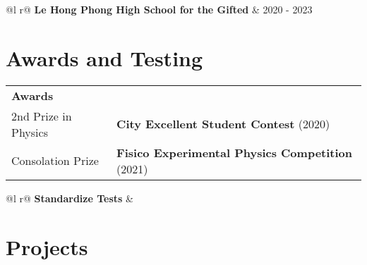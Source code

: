 \documentclass[a4paper,12pt]{article}
\begin{document}
\begin{tabularx}{\linewidth}{ @{}l r@{} }
\textbf{Le Hong Phong High School for the Gifted} & \hfill 2020 - 2023 \\[3.75pt]
\end{tabularx}

\section{Awards and Testing}
\begin{tabularx}{\linewidth}{@{}l X@{}}	
\textbf{Awards} & \hfill \\[3.75pt]
 2nd Prize in Physics & \textbf{City Excellent Student Contest} \hfill \normalsize (2020) \\
Consolation Prize & \textbf{Fisico Experimental Physics Competition} \hfill(2021) \\ 
\end{tabularx}



\begin{tabularx}{\linewidth}{ @{}l r@{} }
\textbf{Standardize Tests} & \hfill \\[3.75pt]
\end{tabularx}


\section{Projects}
\end{document}
